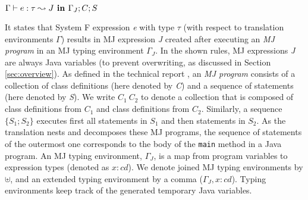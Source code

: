 $\Gamma \vdash  e : \tau \leadsto J \textbf{~in~} \Gamma_J;C;S$

\noindent It states that System F expression \emph{e} with type
$\tau$ (with respect to translation environments
$\Gamma$) results in MJ expression \emph{J} created after executing an
\emph{MJ program} in an MJ typing environment $\Gamma_J$. In the shown rules,
MJ expressions \emph{J} are always Java variables (to prevent overwriting, as discussed
in Section \ref{sec:overview}). As defined in the technical report \cite{bierman03imperative}, 
an \emph{MJ program} consists of a collection of class definitions (here denoted by \emph{C})
and a sequence of statements (here denoted by \emph{S}). We write $C_1~C_2$ to denote a 
collection that is composed of class definitions from $C_1$ and class definitions from $C_2$.
Similarly, a sequence $\{S_1;S_2\}$ executes first all statements in $S_1$ and then statements in $S_2$.
As the translation nests and decomposes these MJ programs, the sequence of statements
of the outermost one corresponds to the body of the \lstinline{main} method in a Java program.
An MJ typing environment, $\Gamma_J$, is a map from program variables to expression types 
\cite{bierman03imperative} (denoted as $x : cd$). We denote joined MJ typing environments
by $\uplus$, and an extended typing environment by a comma ($\Gamma_J, x : cd$).
Typing environments keep track of the generated temporary Java variables. 

